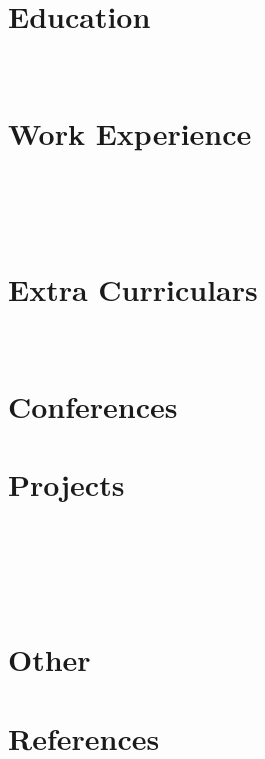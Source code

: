 \documentclass[a4paper,11pt]{article}
\begin{document}
\pagestyle{empty}



\section{Education}
 \\[-18pt]

\section{Work Experience}
 \\[5pt]
 \\[5pt]
 \\[5pt]

% 

\section{Extra Curriculars}
 \\[5pt]



\section{Conferences}



\newpage

\section{Projects}
 \\[5pt]
 \\[5pt]
 \\[5pt]
 \\[5pt]
 

% 
% 
% 
% 

% 

\section{Other}


\section{References}

\end{document}
